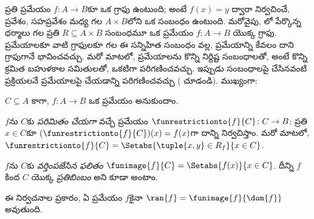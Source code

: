 \documentclass[../../../include/open-logic-section]{subfiles}
\begin{document}
\begin{explain}
ప్రతి ప్రమేయం $f\colon A \to B$కూ ఒక గ్రాఫు ఉంటుంది; అంటే
$f(x) = y$ ద్వారా నిర్వచించే, ప్రవేశం, సహప్రవేశం మధ్య గల
$A \times B$లోని ఒక సంబంధం ఉంటుంది.
మరోవైపు, లో పేర్కొన్న ధర్మాలు గల ప్రతి
$R \subseteq A \times B$ సంబంధమూ ఒక ప్రమేయం $f \colon A \to B$ యొక్క గ్రాఫు.
ప్రమేయాలకూ వాటి గ్రాఫులకూ గల ఈ సన్నిహిత సంబంధం వల్ల,
ప్రమేయాన్ని కేవలం దాని గ్రాఫుగానే భావించవచ్చు. మరో మాటలో,
ప్రమేయాలను కొన్ని నిర్దిష్ట సంబంధాలతో, అంటే కొన్ని క్రమిత బహుళకాల
సమితులతో, ఒకటిగా పరిగణించవచ్చు.
ఇప్పుడు సంబంధాలపై చేసినవంటి ప్రక్రియలనే
ప్రమేయాలపై చేయడాన్ని పరిగణించవచ్చు
( చూడండి). ముఖ్యంగా:
\end{explain}

\begin{defn}
$C\subseteq A$ కాగా, $f \colon A \to B$ ఒక ప్రమేయం అనుకుందాం.

$f$ను $C$కు \emph{పరిమితం చేయగా} వచ్చే ప్రమేయం
$\funrestrictionto{f}{C}\colon C \to B$:
ప్రతి $x \in C$కూ $(\funrestrictionto{f}{C})(x) = f(x)$గా దాన్ని నిర్వచిస్తాం.
మరో మాటలో, $\funrestrictionto{f}{C} = \Setabs{\tuple{x, y} \in R_f}{x \in C}$.

$f$ను $C$కు \emph{వర్తింపజేసిన ఫలితం}
$\funimage{f}{C} = \Setabs{f(x)}{x \in C}$.
దీన్ని $f$ కింద $C$ యొక్క \emph{ప్రతిబింబం} అని కూడా అంటాం.
\end{defn}

\begin{explain}
ఈ నిర్వచనాల ప్రకారం, ఏ ప్రమేయం $f$కైనా
$\ran{f} = \funimage{f}{\dom{f}}$ అవుతుంది.
\end{explain}
\end{document}
